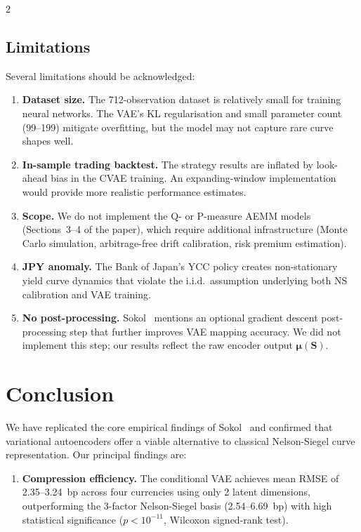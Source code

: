 \documentclass[10pt,a4paper]{article}
\theoremstyle{plain}
\theoremstyle{definition}
\begin{document}
\begin{multicols}{2}
\subsection{Limitations}

Several limitations should be acknowledged:
\begin{enumerate}[nosep]
\item \textbf{Dataset size.} The 712-observation dataset is relatively small for training neural networks. The VAE's KL regularisation and small parameter count (99--199) mitigate overfitting, but the model may not capture rare curve shapes well.
\item \textbf{In-sample trading backtest.} The strategy results are inflated by look-ahead bias in the CVAE training. An expanding-window implementation would provide more realistic performance estimates.
\item \textbf{Scope.} We do not implement the Q- or P-measure AEMM models (Sections~3--4 of the paper), which require additional infrastructure (Monte Carlo simulation, arbitrage-free drift calibration, risk premium estimation).
\item \textbf{JPY anomaly.} The Bank of Japan's YCC policy creates non-stationary yield curve dynamics that violate the i.i.d.\ assumption underlying both NS calibration and VAE training.
\item \textbf{No post-processing.} Sokol~\cite{sokol2022} mentions an optional gradient descent post-processing step that further improves VAE mapping accuracy. We did not implement this step; our results reflect the raw encoder output $\boldsymbol{\mu}(\mathbf{S})$.
\end{enumerate}

\section{Conclusion}\label{sec:conclusion}

We have replicated the core empirical findings of Sokol~\cite{sokol2022} and confirmed that variational autoencoders offer a viable alternative to classical Nelson-Siegel curve representation. Our principal findings are:

\begin{enumerate}[nosep]
\item \textbf{Compression efficiency.} The conditional VAE achieves mean RMSE of 2.35--3.24~bp across four currencies using only 2 latent dimensions, outperforming the 3-factor Nelson-Siegel basis (2.54--6.69~bp) with high statistical significance ($p < 10^{-11}$, Wilcoxon signed-rank test).


\end{enumerate}
\end{multicols}
\end{document}
